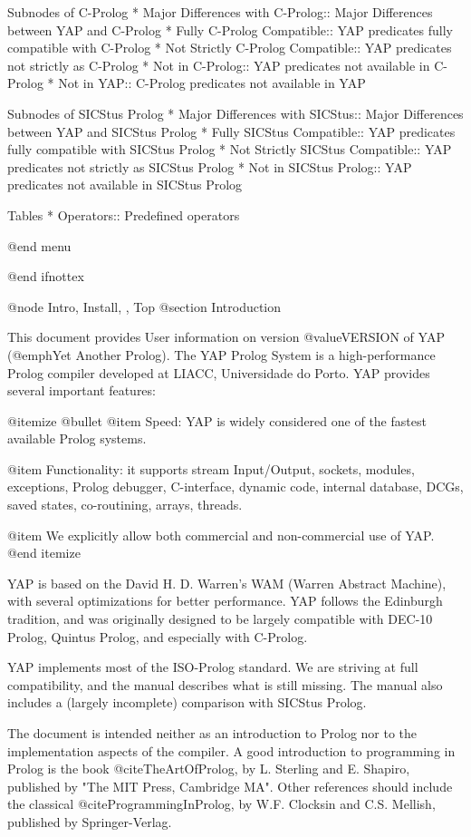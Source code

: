 Subnodes of C-Prolog
* Major Differences with C-Prolog:: Major Differences between YAP and C-Prolog
* Fully C-Prolog Compatible:: YAP predicates fully compatible with
C-Prolog
* Not Strictly C-Prolog Compatible:: YAP predicates not strictly as C-Prolog
* Not in C-Prolog:: YAP predicates not available in C-Prolog
* Not in YAP:: C-Prolog predicates not available in YAP

Subnodes of SICStus Prolog
* Major Differences with SICStus:: Major Differences between YAP and SICStus Prolog
* Fully SICStus Compatible:: YAP predicates fully compatible with
SICStus Prolog
* Not Strictly SICStus Compatible:: YAP predicates not strictly as
SICStus Prolog
* Not in SICStus Prolog:: YAP predicates not available in SICStus Prolog


Tables
* Operators:: Predefined operators

@end menu

@end ifnottex

@node Intro, Install, , Top
@section Introduction

This document provides User information on version @value{VERSION} of
YAP (@emph{Yet Another Prolog}). The YAP Prolog System is a
high-performance Prolog compiler developed at LIACC, Universidade do
Porto. YAP provides several important features:

@itemize @bullet
 @item Speed: YAP is widely considered one of the fastest available
Prolog systems.

 @item Functionality: it supports stream Input/Output, sockets, modules,
exceptions, Prolog debugger, C-interface, dynamic code, internal
database, DCGs, saved states, co-routining, arrays, threads.

 @item We explicitly allow both commercial and non-commercial use of YAP.
@end itemize

YAP is based on the David H. D. Warren's WAM (Warren Abstract Machine),
with several optimizations for better performance. YAP follows the
Edinburgh tradition, and was originally designed to be largely
compatible with DEC-10 Prolog, Quintus Prolog, and especially with
C-Prolog.

YAP implements most of the ISO-Prolog standard. We are striving at
full compatibility, and the manual describes what is still
missing. The manual also includes a (largely incomplete) comparison
with SICStus Prolog.

The document is intended neither as an introduction to Prolog nor to the
implementation aspects of the compiler. A good introduction to
programming in Prolog is the book @cite{TheArtOfProlog}, by
L. Sterling and E. Shapiro, published by "The MIT Press, Cambridge
MA". Other references should include the classical @cite{ProgrammingInProlog}, by W.F. Clocksin and C.S. Mellish, published by
Springer-Verlag.

